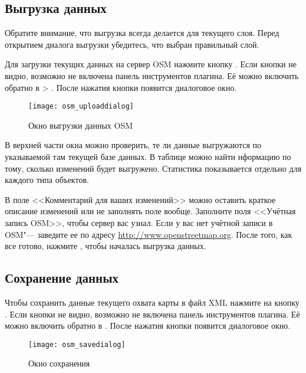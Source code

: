 \subsection{Выгрузка данных}

Обратите внимание, что выгрузка всегда делается для текущего слоя. Перед
открытием диалога выгрузки убедитесь, что выбран правильный слой.

Для загрузки текущих данных на сервер OSM нажмите кнопку
. Если кнопки не видно,
возможно не включена панель инструментов плагина. Её можно включить
обратно в  \arrow {} >
. После нажатия кнопки 
появится диалоговое окно.

\begin{figure}[ht]
   \centering
   \texttt{[image: osm\_uploaddialog]}
   \caption{Окно выгрузки данных OSM \nixcaption}\label{fig:osmupload}
\end{figure}

В верхней части окна можно проверить, те ли данные выгружаются по
указываемой там текущей базе данных. В таблице можно найти нформацию по
тому, сколько изменений будет выгружено. Статистика показывается
отдельно для каждого типа объектов.

В поле <<Комментарий для ваших изменений>> можно оставить краткое
описание изменений или не заполнять поле вообще. Заполните поля
<<Учётная запись OSM>>, чтобы сервер вас узнал. Если у вас нет учётной
записи в OSM"--- заведите ее по адресу \url{http://www.openstreetmap.org}.
После того, как все готово, нажмите , чтобы началась
выгрузка данных.

\subsection{Сохранение данных}

Чтобы сохранить данные текущего охвата карты в файл XML нажмите на кнопку
. Если кнопки не видно, возможно
не включена панель инструментов плагина. Её можно включить обратно в
 \arrow {} \arrow
{}. После нажатия кнопки появится диалоговое
окно.

\begin{figure}[ht]
   \centering
   \texttt{[image: osm\_savedialog]}
   \caption{Окно сохранения \nixcaption}\label{fig:osmsave}
\end{figure}

